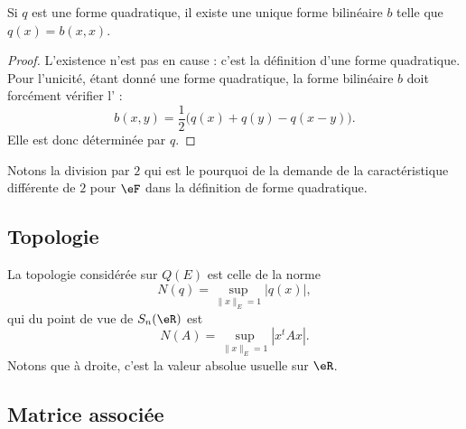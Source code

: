 \begin{lemma}       \label{LEMooLKNTooSfLSHt}
    Si \( q\) est une forme quadratique, il existe une unique forme bilinéaire \( b\) telle que \( q(x)=b(x,x)\).
\end{lemma}

\begin{proof}
    L'existence n'est pas en cause : c'est la définition d'une forme quadratique. Pour l'unicité, étant donné une forme quadratique, la forme bilinéaire \( b\) doit forcément vérifier l' :
\begin{equation}    \label{EqMrbsop}
    b(x,y)=\frac{ 1 }{2}\big( q(x)+q(y)-q(x-y) \big).
\end{equation}
Elle est donc déterminée par \( q\).
\end{proof}
Notons la division par \( 2\) qui est le pourquoi de la demande de la caractéristique différente de \( 2\) pour \( \eF\) dans la définition de forme quadratique.

\subsection{Topologie}

La topologie considérée sur \( Q(E)\) est celle de la norme
\begin{equation}    \label{EqZYBooZysmVh}
    N(q)=\sup_{\| x \|_E=1}| q(x) |,
\end{equation}
qui du point de vue de \( S_n(\eR)\) est
\begin{equation}    
    N(A)=\sup_{\| x \|_E=1}| x^tAx |.
\end{equation}
Notons que à droite, c'est la valeur absolue usuelle sur \( \eR\).

\subsection{Matrice associée}

